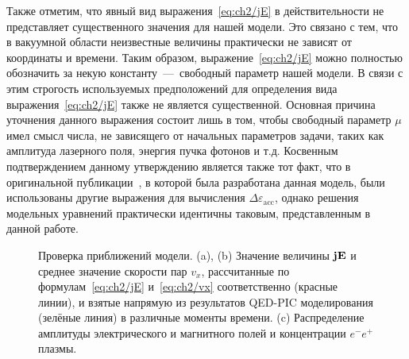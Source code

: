 Также отметим, что явный вид выражения~\eqref{eq:ch2/jE} в действительности не представляет существенного значения для нашей модели.
Это связано с тем, что в вакуумной области неизвестные величины практически не зависят от координаты и времени.
Таким образом, выражение~\eqref{eq:ch2/jE} можно полностью обозначить за некую константу~---~свободный параметр нашей модели.
В связи с этим строгость используемых предположений для определения вида выражения~\eqref{eq:ch2/jE} также не является существенной.
Основная причина уточнения данного выражения состоит лишь в том, чтобы свободный параметр $\mu$ имел смысл числа, не зависящего от начальных параметров задачи, таких как амплитуда лазерного поля, энергия пучка фотонов и т.д.
Косвенным подтверждением данному утверждению является также тот факт, что в оригинальной публикации~\cite{samsonov2021hydrodynamical}, в которой была разработана данная модель, были использованы другие выражения для вычисления $\Delta\varepsilon_\mathrm{acc}$, однако решения модельных уравнений практически идентичны таковым, представленным в данной работе.

\begin{figure}[ht]
    \caption[Проверка приближений аналитической модели развития КЭД каскада в плоской волне]{\label{fig:ch2/sec3/assumptions} 
    Проверка приближений модели. (a), (b) Значение величины $\vb{jE}$ и среднее значение скорости пар $v_x$, рассчитанные по формулам~\eqref{eq:ch2/jE} и~\eqref{eq:ch2/vx} соответственно (красные линии), и взятые напрямую из результатов QED-PIC моделирования (зелёные линия) в различные моменты времени. (c) Распределение амплитуды электрического и магнитного полей и концентрации $e^-e^+$ плазмы. }
\end{figure}

